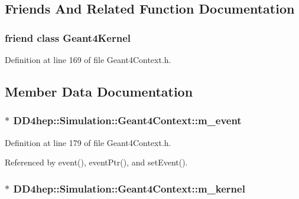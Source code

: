 \subsection{Friends And Related Function Documentation}
\hypertarget{class_d_d4hep_1_1_simulation_1_1_geant4_context_ade874a98c0c1bcb1b8c2d456037b3f5a}{
\subsubsection[{Geant4Kernel}]{\setlength{\rightskip}{0pt plus 5cm}friend class {\bf Geant4Kernel}}}
\label{class_d_d4hep_1_1_simulation_1_1_geant4_context_ade874a98c0c1bcb1b8c2d456037b3f5a}


Definition at line 169 of file Geant4Context.h.

\subsection{Member Data Documentation}
\hypertarget{class_d_d4hep_1_1_simulation_1_1_geant4_context_a3aba509b9246b6e8b8c89a9bf61b9a4c}{
\subsubsection[{m\_\-event}]{$\ast$ {\bf DD4hep::Simulation::Geant4Context::m\_\-event}}}
\label{class_d_d4hep_1_1_simulation_1_1_geant4_context_a3aba509b9246b6e8b8c89a9bf61b9a4c}


Definition at line 179 of file Geant4Context.h.

Referenced by event(), eventPtr(), and setEvent().\hypertarget{class_d_d4hep_1_1_simulation_1_1_geant4_context_a039b270efa705522ec33989d69518c49}{
\subsubsection[{m\_\-kernel}]{$\ast$ {\bf DD4hep::Simulation::Geant4Context::m\_\-kernel}}}
\label{class_d_d4hep_1_1_simulation_1_1_geant4_context_a039b270efa705522ec33989d69518c49}


